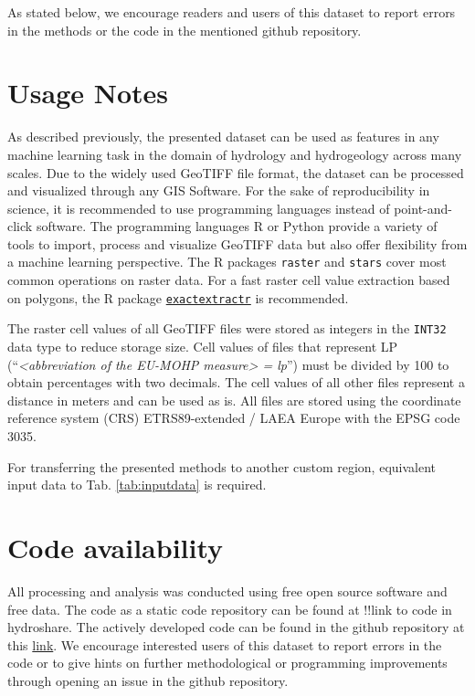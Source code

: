 \documentclass[fleqn,10pt]{wlscirep}
\begin{document}
As stated below, we encourage readers and users of this dataset to report errors in the methods or the code in the mentioned github repository.

\hypertarget{usage-notes}{%
\section*{Usage Notes}\label{usage-notes}}

As described previously, the presented dataset can be used as features in any machine learning task in the domain of hydrology and hydrogeology across many scales. Due to the widely used GeoTIFF file format, the dataset can be processed and visualized through any GIS Software. For the sake of reproducibility in science, it is recommended to use programming languages instead of point-and-click software. The programming languages R or Python provide a variety of tools to import, process and visualize GeoTIFF data but also offer flexibility from a machine learning perspective. The R packages \texttt{raster} and \texttt{stars} \cite{hijmans_raster_2020, pebesma_stars_2021} cover most common operations on raster data. For a fast raster cell value extraction based on polygons, the R package \href{https://github.com/isciences/exactextractr}{\texttt{exactextractr}} is recommended.

The raster cell values of all GeoTIFF files were stored as integers in the \texttt{INT32} data type to reduce storage size. Cell values of files that represent LP (``\emph{\textless abbreviation of the EU-MOHP measure\textgreater{} = lp}'') must be divided by 100 to obtain percentages with two decimals. The cell values of all other files represent a distance in meters and can be used as is. All files are stored using the coordinate reference system (CRS) ETRS89-extended / LAEA Europe with the EPSG code 3035.

For transferring the presented methods to another custom region, equivalent input data to Tab. \ref{tab:inputdata} is required.

\hypertarget{code-availability}{%
\section*{Code availability}\label{code-availability}}

All processing and analysis was conducted using free open source software and free data.
The code as a static code repository can be found at !!link to code in hydroshare.
The actively developed code can be found in the github repository at this \href{https://github.com/MxNl/macro_mohp_feature}{link}. We encourage interested users of this dataset to report errors in the code or to give hints on further methodological or programming improvements through opening an issue in the github repository.
\end{document}
